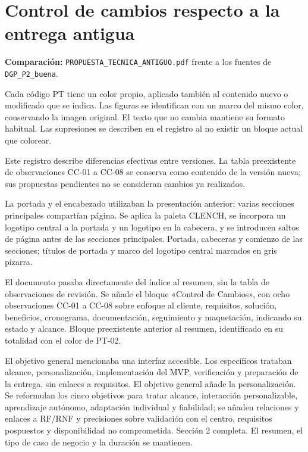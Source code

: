 \section*{Control de cambios respecto a la entrega antigua}
{}
\begingroup
\small
\noindent\textbf{Comparación:} \texttt{PROPUESTA\_TECNICA\_ANTIGUO.pdf} frente a los fuentes de \texttt{DGP\_P2\_buena}.

Cada código PT tiene un color propio, aplicado también al contenido nuevo o modificado que se indica. Las figuras se identifican con un marco del mismo color, conservando la imagen original. El texto que no cambia mantiene su formato habitual. Las supresiones se describen en el registro al no existir un bloque actual que colorear.

Este registro describe diferencias efectivas entre versiones. La tabla preexistente de observaciones CC-01 a CC-08 se conserva como contenido de la versión nueva; sus propuestas pendientes no se consideran cambios ya realizados.

{La portada y el encabezado utilizaban la presentación anterior; varias secciones principales compartían página.}
{Se aplica la paleta CLENCH, se incorpora un logotipo central a la portada y un logotipo en la cabecera, y se introducen saltos de página antes de las secciones principales.}
{Portada, cabeceras y comienzo de las secciones; títulos de portada y marco del logotipo central marcados en gris pizarra.}

{El documento pasaba directamente del índice al resumen, sin la tabla de observaciones de revisión.}
{Se añade el bloque «Control de Cambios», con ocho observaciones CC-01 a CC-08 sobre enfoque al cliente, requisitos, solución, beneficios, cronograma, documentación, seguimiento y maquetación, indicando su estado y alcance.}
{Bloque preexistente anterior al resumen, identificado en su totalidad con el color de PT-02.}

{El objetivo general mencionaba una interfaz accesible. Los específicos trataban alcance, personalización, implementación del MVP, verificación y preparación de la entrega, sin enlaces a requisitos.}
{El objetivo general añade la personalización. Se reformulan los cinco objetivos para tratar alcance, interacción personalizable, aprendizaje autónomo, adaptación individual y fiabilidad; se añaden relaciones y enlaces a RF/RNF y precisiones sobre validación con el centro, requisitos pospuestos y disponibilidad no comprometida.}
{Sección 2 completa. El resumen, el tipo de caso de negocio y la duración se mantienen.}

